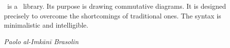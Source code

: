




\thispagestyle{empty}
\noindent
{}\\[0.62em]
\\[1.62em]
\par
\vfill
{}


\newpage
\noindent\koDi\ is a \TikZ\ library. Its purpose
is drawing commutative diagrams.
It is designed precisely to overcome
the shortcomings of traditional ones.
The syntax is minimalistic and intelligible.\par
\hfill{\itshape Paolo al-Imkānī Brasolin}

